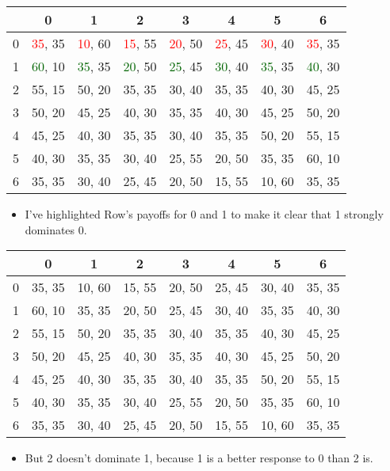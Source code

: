 \documentclass[
  ignorenonframetext,
]{beamer}
\providecommand{\tightlist}{%
  \setlength{\itemsep}{0pt}\setlength{\parskip}{0pt}}
\begin{document}
\begin{frame}
\begin{table}[!h]
\centering
\begin{tabular}[t]{>{}r|ccccccc}
\toprule
 & 0 & 1 & 2 & 3 & 4 & 5 & 6\\
\midrule
0 & \textcolor{red}{35}, 35 & \textcolor{red}{10}, 60 & \textcolor{red}{15}, 55 & \textcolor{red}{20}, 50 & \textcolor{red}{25}, 45 & \textcolor{red}{30}, 40 & \textcolor{red}{35}, 35\\
1 & \textcolor{darkgreen}{60}, 10 & \textcolor{darkgreen}{35}, 35 & \textcolor{darkgreen}{20}, 50 & \textcolor{darkgreen}{25}, 45 & \textcolor{darkgreen}{30}, 40 & \textcolor{darkgreen}{35}, 35 & \textcolor{darkgreen}{40}, 30\\
2 & 55, 15 & 50, 20 & 35, 35 & 30, 40 & 35, 35 & 40, 30 & 45, 25\\
3 & 50, 20 & 45, 25 & 40, 30 & 35, 35 & 40, 30 & 45, 25 & 50, 20\\
4 & 45, 25 & 40, 30 & 35, 35 & 30, 40 & 35, 35 & 50, 20 & 55, 15\\
5 & 40, 30 & 35, 35 & 30, 40 & 25, 55 & 20, 50 & 35, 35 & 60, 10\\
6 & 35, 35 & 30, 40 & 25, 45 & 20, 50 & 15, 55 & 10, 60 & 35, 35\\
\bottomrule
\end{tabular}
\end{table}

\begin{itemize}
\tightlist
\item
  I've highlighted Row's payoffs for 0 and 1 to make it clear that 1
  strongly dominates 0.
\end{itemize}
\end{frame}

\begin{frame}
\begin{table}[!h]
\centering
\begin{tabular}[t]{>{}r|ccccccc}
\toprule
 & 0 & 1 & 2 & 3 & 4 & 5 & 6\\
\midrule
0 & 35, 35 & 10, 60 & 15, 55 & 20, 50 & 25, 45 & 30, 40 & 35, 35\\
1 & 60, 10 & 35, 35 & 20, 50 & 25, 45 & 30, 40 & 35, 35 & 40, 30\\
2 & 55, 15 & 50, 20 & 35, 35 & 30, 40 & 35, 35 & 40, 30 & 45, 25\\
3 & 50, 20 & 45, 25 & 40, 30 & 35, 35 & 40, 30 & 45, 25 & 50, 20\\
4 & 45, 25 & 40, 30 & 35, 35 & 30, 40 & 35, 35 & 50, 20 & 55, 15\\
5 & 40, 30 & 35, 35 & 30, 40 & 25, 55 & 20, 50 & 35, 35 & 60, 10\\
6 & 35, 35 & 30, 40 & 25, 45 & 20, 50 & 15, 55 & 10, 60 & 35, 35\\
\bottomrule
\end{tabular}
\end{table}

\begin{itemize}
\tightlist
\item
  But 2 doesn't dominate 1, because 1 is a better response to 0 than 2
  is.
\end{itemize}
\end{frame}
\end{document}
